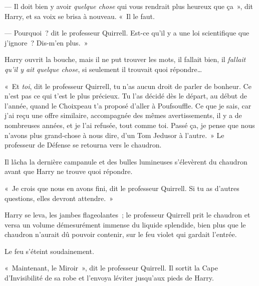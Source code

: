 --- Il doit bien y avoir \emph{quelque chose} qui vous rendrait plus heureux que ça~», dit Harry, et sa voix se brisa à nouveau. «~Il le faut.

--- Pourquoi~? dit le professeur Quirrell. Est-ce qu'il y a une loi scientifique que j'ignore~? Dis-m'en plus.~»

Harry ouvrit la bouche, mais il ne put trouver les mots, il fallait bien, il \emph{fallait qu'il y ait quelque chose}, si seulement il trouvait quoi répondre…

«~Et \emph{toi}, dit le professeur Quirrell, tu n'as aucun droit de parler de bonheur. Ce n'est pas ce qui t'est le plus précieux. Tu l'as décidé dès le départ, au début de l'année, quand le Choixpeau t'a proposé d'aller à Poufsouffle. Ce que je sais, car j'ai reçu une offre similaire, accompagnée des mêmes avertissements, il y a de nombreuses années, et je l'ai refusée, tout comme toi. Passé ça, je pense que nous n'avons plus grand-chose à nous dire, d'un Tom Jedusor à l'autre.~» Le professeur de Défense se retourna vers le chaudron.

Il lâcha la dernière campanule et des bulles lumineuses s'élevèrent du chaudron avant que Harry ne trouve quoi répondre.

«~Je crois que nous en avons fini, dit le professeur Quirrell. Si tu as d'autres questions, elles devront attendre.~»

Harry se leva, les jambes flageolantes~; le professeur Quirrell prit le chaudron et versa un volume démesurément immense du liquide splendide, bien plus que le chaudron n'aurait dû pouvoir contenir, sur le feu violet qui gardait l'entrée.

Le feu s'éteint soudainement.

«~Maintenant, le Miroir~», dit le professeur Quirrell. Il sortit la Cape d'Invisibilité de sa robe et l'envoya léviter jusqu'aux pieds de Harry.
